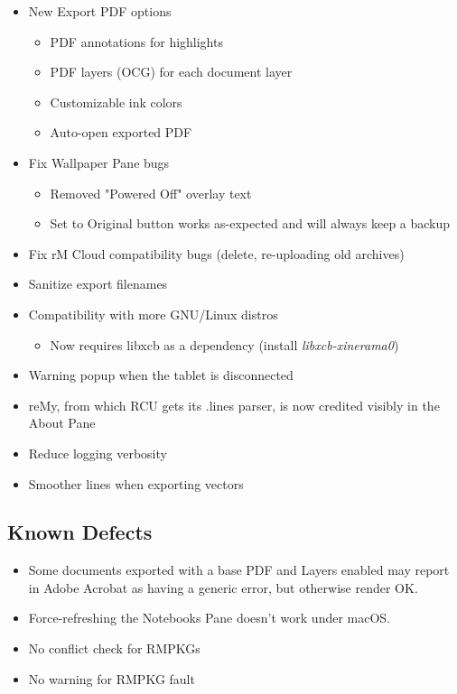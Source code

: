 \documentclass{memoir}
\begin{document}
{{\begin{itemize}
\item{New Export PDF options}
  \begin{itemize}
  \item{PDF annotations for highlights}
  \item{PDF layers (OCG) for each document layer}
  \item{Customizable ink colors}
  \item{Auto-open exported PDF}
  \end{itemize}
\item{Fix Wallpaper Pane bugs}
  \begin{itemize}
  \item{Removed "Powered Off" overlay text}
  \item{Set to Original button works as-expected and will always keep a backup}
  \end{itemize}
\item{Fix rM Cloud compatibility bugs (delete, re-uploading old archives)}
\item{Sanitize export filenames}
\item{Compatibility with more GNU/Linux distros}
  \begin{itemize}
  \item{Now requires libxcb as a dependency (install \textit{libxcb-xinerama0})}
  \end{itemize}
\item{Warning popup when the tablet is disconnected}
\item{reMy, from which RCU gets its .lines parser, is now credited visibly in the About Pane}
\item{Reduce logging verbosity}
\item{Smoother lines when exporting vectors}
\end{itemize}

\subsection{Known Defects}
\begin{itemize}
\item{Some documents exported with a base PDF and Layers enabled may report in Adobe Acrobat as having a generic error, but otherwise render OK.}
\item{Force-refreshing the Notebooks Pane doesn't work under macOS.}
\item{No conflict check for RMPKGs}
\item{No warning for RMPKG fault}
\end{itemize}



}}
\end{document}
